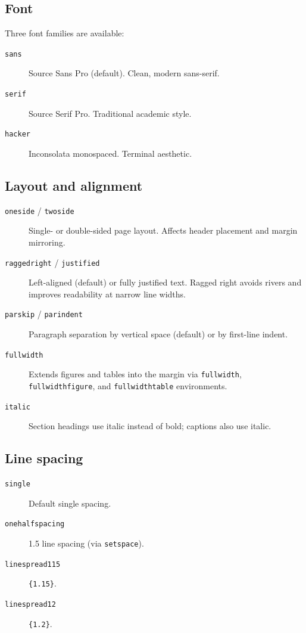 \documentclass[sans,oneside,numeric,raggedright]{qarticle}
\begin{document}
\subsection{Font}

Three font families are available:
\begin{description}
  \item[\texttt{sans}] Source Sans Pro (default).  Clean, modern sans-serif.
  \item[\texttt{serif}] Source Serif Pro.  Traditional academic style.
  \item[\texttt{hacker}] Inconsolata monospaced.  Terminal aesthetic.
\end{description}

\subsection{Layout and alignment}

\begin{description}
  \item[\texttt{oneside} / \texttt{twoside}] Single- or double-sided page
    layout.  Affects header placement and margin mirroring.
  \item[\texttt{raggedright} / \texttt{justified}] Left-aligned (default) or
    fully justified text.  Ragged right avoids rivers and improves
    readability at narrow line widths.
  \item[\texttt{parskip} / \texttt{parindent}] Paragraph separation by
    vertical space (default) or by first-line indent.
  \item[\texttt{fullwidth}] Extends figures and tables into the margin via
    \texttt{fullwidth}, \texttt{fullwidthfigure}, and
    \texttt{fullwidthtable} environments.
  \item[\texttt{italic}] Section headings use italic instead of bold;
    captions also use italic.
\end{description}

\subsection{Line spacing}

\begin{description}
  \item[\texttt{single}] Default single spacing.
  \item[\texttt{onehalfspacing}] 1.5 line spacing (via \texttt{setspace}).
  \item[\texttt{linespread115}] \texttt{\string\linespread\{1.15\}}.
  \item[\texttt{linespread12}] \texttt{\string\linespread\{1.2\}}.
\end{description}
\end{document}
